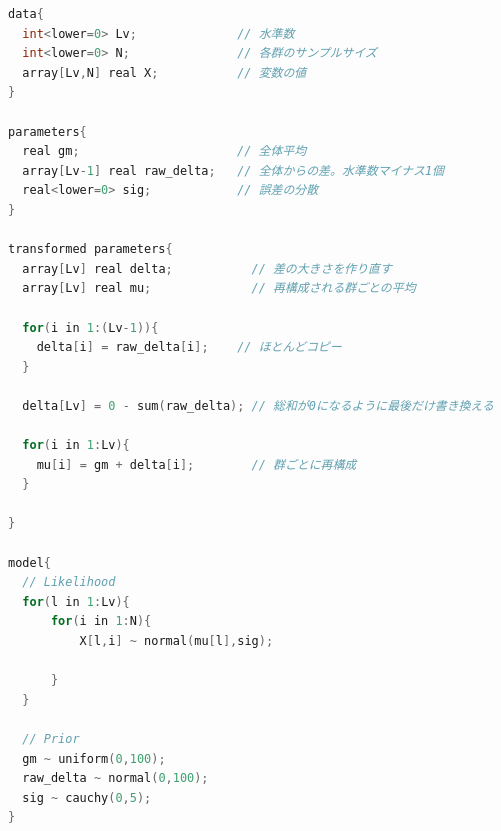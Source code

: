 \documentclass{ltjsbook}
\begin{document}
\begin{lstlisting}[language=C++,label={stan::21_05},caption={群の数を一般化したコード}]
data{
  int<lower=0> Lv;              // 水準数
  int<lower=0> N;               // 各群のサンプルサイズ       
  array[Lv,N] real X;           // 変数の値
}

parameters{
  real gm;                      // 全体平均
  array[Lv-1] real raw_delta;   // 全体からの差。水準数マイナス1個
  real<lower=0> sig;            // 誤差の分散
}

transformed parameters{
  array[Lv] real delta;           // 差の大きさを作り直す
  array[Lv] real mu;              // 再構成される群ごとの平均
  
  for(i in 1:(Lv-1)){
    delta[i] = raw_delta[i];    // ほとんどコピー
  }
  
  delta[Lv] = 0 - sum(raw_delta); // 総和が0になるように最後だけ書き換える

  for(i in 1:Lv){
    mu[i] = gm + delta[i];        // 群ごとに再構成
  }
  
}

model{
  // Likelihood
  for(l in 1:Lv){
      for(i in 1:N){
          X[l,i] ~ normal(mu[l],sig);
          
      }
  }
    
  // Prior
  gm ~ uniform(0,100);
  raw_delta ~ normal(0,100);
  sig ~ cauchy(0,5);
}

\end{lstlisting}
\end{document}
